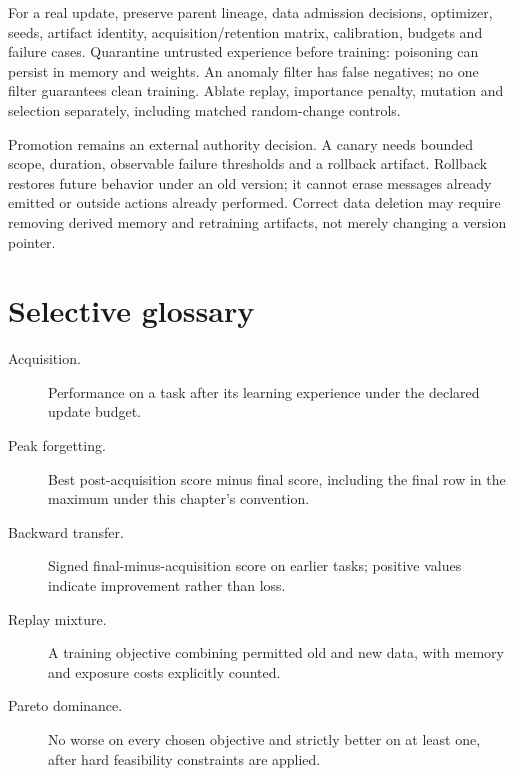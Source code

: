 For a real update, preserve parent lineage, data admission decisions, optimizer,
seeds, artifact identity, acquisition/retention matrix, calibration, budgets and
failure cases. Quarantine untrusted experience before training: poisoning can
persist in memory and weights. An anomaly filter has false negatives; no one
filter guarantees clean training. Ablate replay, importance penalty, mutation
and selection separately, including matched random-change controls.

Promotion remains an external authority decision. A canary needs bounded scope,
duration, observable failure thresholds and a rollback artifact. Rollback restores
future behavior under an old version; it cannot erase messages already emitted
or outside actions already performed. Correct data deletion may require removing
derived memory and retraining artifacts, not merely changing a version pointer.

\section{Selective glossary}
\begin{description}
\item[Acquisition.] Performance on a task after its learning experience under
the declared update budget.
\item[Peak forgetting.] Best post-acquisition score minus final score, including
the final row in the maximum under this chapter's convention.
\item[Backward transfer.] Signed final-minus-acquisition score on earlier tasks;
positive values indicate improvement rather than loss.
\item[Replay mixture.] A training objective combining permitted old and new
data, with memory and exposure costs explicitly counted.
\item[Pareto dominance.] No worse on every chosen objective and strictly better
on at least one, after hard feasibility constraints are applied.
\end{description}

